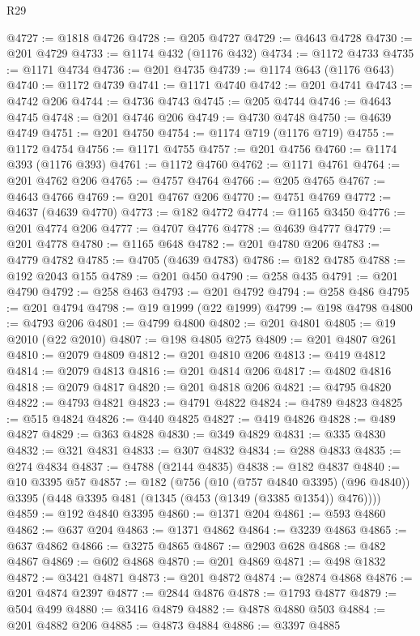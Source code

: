 \begin{lexlean}{R29}
\begin{coremodule}
@4727 := @1818 @4726
@4728 := @205 @4727
@4729 := @4643 @4728
@4730 := @201 @4729
@4733 := @1174 @432 (@1176 @432)
@4734 := @1172 @4733
@4735 := @1171 @4734
@4736 := @201 @4735
@4739 := @1174 @643 (@1176 @643)
@4740 := @1172 @4739
@4741 := @1171 @4740
@4742 := @201 @4741
@4743 := @4742 @206
@4744 := @4736 @4743
@4745 := @205 @4744
@4746 := @4643 @4745
@4748 := @201 @4746 @206
@4749 := @4730 @4748
@4750 := @4639 @4749
@4751 := @201 @4750
@4754 := @1174 @719 (@1176 @719)
@4755 := @1172 @4754
@4756 := @1171 @4755
@4757 := @201 @4756
@4760 := @1174 @393 (@1176 @393)
@4761 := @1172 @4760
@4762 := @1171 @4761
@4764 := @201 @4762 @206
@4765 := @4757 @4764
@4766 := @205 @4765
@4767 := @4643 @4766
@4769 := @201 @4767 @206
@4770 := @4751 @4769
@4772 := @4637 (@4639 @4770)
@4773 := @182 @4772
@4774 := @1165 @3450
@4776 := @201 @4774 @206
@4777 := @4707 @4776
@4778 := @4639 @4777
@4779 := @201 @4778
@4780 := @1165 @648
@4782 := @201 @4780 @206
@4783 := @4779 @4782
@4785 := @4705 (@4639 @4783)
@4786 := @182 @4785
@4788 := @192 @2043 @155
@4789 := @201 @450
@4790 := @258 @435
@4791 := @201 @4790
@4792 := @258 @463
@4793 := @201 @4792
@4794 := @258 @486
@4795 := @201 @4794
@4798 := @19 @1999 (@22 @1999)
@4799 := @198 @4798
@4800 := @4793 @206
@4801 := @4799 @4800
@4802 := @201 @4801
@4805 := @19 @2010 (@22 @2010)
@4807 := @198 @4805 @275
@4809 := @201 @4807 @261
@4810 := @2079 @4809
@4812 := @201 @4810 @206
@4813 := @419 @4812
@4814 := @2079 @4813
@4816 := @201 @4814 @206
@4817 := @4802 @4816
@4818 := @2079 @4817
@4820 := @201 @4818 @206
@4821 := @4795 @4820
@4822 := @4793 @4821
@4823 := @4791 @4822
@4824 := @4789 @4823
@4825 := @515 @4824
@4826 := @440 @4825
@4827 := @419 @4826
@4828 := @489 @4827
@4829 := @363 @4828
@4830 := @349 @4829
@4831 := @335 @4830
@4832 := @321 @4831
@4833 := @307 @4832
@4834 := @288 @4833
@4835 := @274 @4834
@4837 := @4788 (@2144 @4835)
@4838 := @182 @4837
@4840 := @10 @3395 @57
@4857 := @182
    (@756
      (@10 (@757 @4840 @3395) (@96 @4840))
      @3395
      (@448 @3395 @481 (@1345 (@453 (@1349 (@3385 @1354)) @476))))
@4859 := @192 @4840 @3395
@4860 := @1371 @204
@4861 := @593 @4860
@4862 := @637 @204
@4863 := @1371 @4862
@4864 := @3239 @4863
@4865 := @637 @4862
@4866 := @3275 @4865
@4867 := @2903 @628
@4868 := @482 @4867
@4869 := @602 @4868
@4870 := @201 @4869
@4871 := @498 @1832
@4872 := @3421 @4871
@4873 := @201 @4872
@4874 := @2874 @4868
@4876 := @201 @4874 @2397
@4877 := @2844 @4876
@4878 := @1793 @4877
@4879 := @504 @499
@4880 := @3416 @4879
@4882 := @4878 @4880 @503
@4884 := @201 @4882 @206
@4885 := @4873 @4884
@4886 := @3397 @4885

\end{coremodule}
\end{lexlean}
